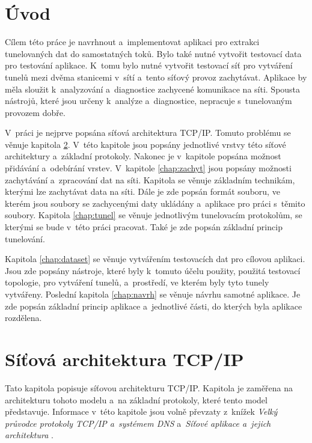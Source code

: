 
\chapter{Úvod}
\label{chap:uvod}
Cílem této práce je navrhnout a~implementovat aplikaci pro extrakci tunelovaných dat do samostatných toků. Bylo také nutné vytvořit testovací data pro testování aplikace. K~tomu bylo nutné vytvořit testovací síť pro vytváření tunelů mezi dvěma stanicemi v~sítí a~tento síťový provoz zachytávat. Aplikace by měla sloužit k~analyzování a~diagnostice zachycené komunikace na síti. Spousta nástrojů, které jsou určeny k~analýze a~diagnostice, nepracuje s~tunelovaným provozem dobře. 

V~práci je nejprve popsána síťová architektura TCP/IP. Tomuto problému se věnuje kapitola \ref{chap:tcp_ip}. V~této kapitole jsou popsány jednotlivé vrstvy této síťové architektury a~základní protokoly. Nakonec je v~kapitole popsána možnost přidávání a~odebírání vrstev.
V~kapitole \ref{chap:zachyt} jsou popsány možnosti zachytávání a~zpracování dat na síti. Kapitola se věnuje základním technikám, kterými lze zachytávat data na síti. Dále je zde popsán formát souboru, ve kterém jsou soubory se zachycenými daty ukládány a~aplikace pro práci s~těmito soubory.
Kapitola \ref{chap:tunel} se věnuje jednotlivým tunelovacím protokolům, se kterými se bude v~této práci pracovat. Také je zde popsán základní princip tunelování. 

Kapitola \ref{chap:dataset} se věnuje vytvářením testovacích dat pro cílovou aplikaci. Jsou zde popsány nástroje, které byly k~tomuto účelu použity, použitá testovací topologie, pro vytváření tunelů, a~prostředí, ve kterém byly tyto tunely vytvářeny.
Poslední kapitola \ref{chap:navrh} se věnuje návrhu samotné aplikace. Je zde popsán základní princip aplikace a~jednotlivé části, do kterých byla aplikace rozdělena. 

\chapter{Síťová architektura TCP/IP}
\label{chap:tcp_ip}
Tato kapitola popisuje síťovou architekturu TCP/IP. Kapitola je zaměřena na architekturu tohoto modelu a~na základní protokoly, které tento model představuje. Informace v~této kapitole jsou volně převzaty z~knížek \emph{Velký průvodce protokoly TCP/IP a~systémem DNS} \cite{pruvodce} a~\emph{Síťové aplikace a~jejich architektura} \cite{matousek}.

